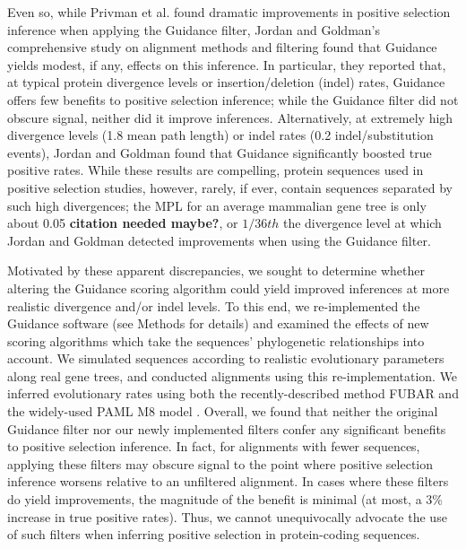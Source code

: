 \documentclass[10pt]{article}
\begin{document}
Even so, while Privman et al. \citep{Privman2012} found dramatic improvements in positive selection inference when applying the Guidance filter, Jordan and Goldman's \citep{Jordan2011} comprehensive study on alignment methods and filtering found that Guidance yields modest, if any, effects on this inference. In particular, they reported that, at typical protein divergence levels or insertion/deletion (indel) rates, Guidance offers few benefits to positive selection inference; while the Guidance filter did not obscure signal, neither did it improve inferences. Alternatively, at extremely high divergence levels (1.8 mean path length) or indel rates (0.2 indel/substitution events), Jordan and Goldman found that Guidance significantly boosted true positive rates. While these results are compelling, protein sequences used in positive selection studies, however, rarely, if ever, contain sequences separated by such high divergences; the MPL for an average mammalian gene tree is only about 0.05 \textbf{citation needed maybe?}, or $1/36th$ the divergence level at which Jordan and Goldman detected improvements when using the Guidance filter.

Motivated by these apparent discrepancies, we sought to determine whether altering the Guidance scoring algorithm could yield improved inferences at more realistic divergence and/or indel levels. To this end, we re-implemented the Guidance software (see Methods for details) and examined the effects of new scoring algorithms which take the sequences' phylogenetic relationships into account. We simulated sequences according to realistic evolutionary parameters along real gene trees, and conducted alignments using this re-implementation. We inferred evolutionary rates using both the recently-described method FUBAR \citep{Murrell2013} and the widely-used PAML M8 model \citep{Yang2007}.
Overall, we found that neither the original Guidance filter nor our newly implemented filters confer any significant benefits to positive selection inference. In fact, for alignments with fewer sequences, applying these filters may obscure signal to the point where positive selection inference worsens relative to an unfiltered alignment. In cases where these filters do yield improvements, the magnitude of the benefit is minimal (at most, a 3\% increase in true positive rates). Thus, we cannot unequivocally advocate the use of such filters when inferring positive selection in protein-coding sequences.
\end{document}
